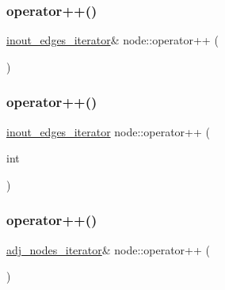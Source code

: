 \mbox{\label{classnode_a934fd5ac6865ae23f3b2758a573550ec}} 
\subsubsection{\texorpdfstring{operator++()}{operator++()}\hspace{0.1cm}{\footnotesize\ttfamily [3/6]}}
{\footnotesize\ttfamily \mbox{\hyperlink{classnode_a854d596611e6a3342090cce71cedf300}{inout\+\_\+edges\+\_\+iterator}}\& node\+::operator++ (\begin{DoxyParamCaption}{ }\end{DoxyParamCaption})}

\mbox{\label{classnode_a754f5fcf2ab3d5bf26e1e4fdc47cc766}} 
\subsubsection{\texorpdfstring{operator++()}{operator++()}\hspace{0.1cm}{\footnotesize\ttfamily [4/6]}}
{\footnotesize\ttfamily \mbox{\hyperlink{classnode_a854d596611e6a3342090cce71cedf300}{inout\+\_\+edges\+\_\+iterator}} node\+::operator++ (\begin{DoxyParamCaption}\item[{int}]{ }\end{DoxyParamCaption})}

\mbox{\label{classnode_a5c9569e6719a8bebd6dd78266a0da533}} 
\subsubsection{\texorpdfstring{operator++()}{operator++()}\hspace{0.1cm}{\footnotesize\ttfamily [5/6]}}
{\footnotesize\ttfamily \mbox{\hyperlink{classnode_a392f19ea6dfa344bdf5c4d5a4b25eb8c}{adj\+\_\+nodes\+\_\+iterator}}\& node\+::operator++ (\begin{DoxyParamCaption}{ }\end{DoxyParamCaption})}

\mbox{\label{classnode_af12ab69bcd07d4d41052b50801690520}} 
